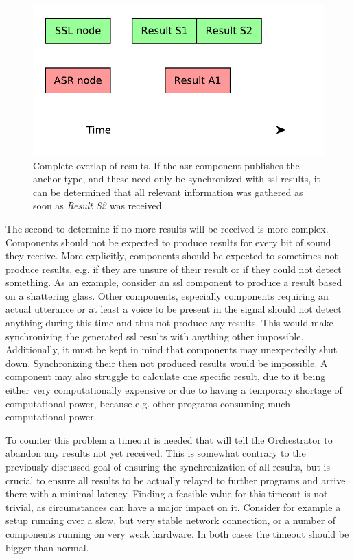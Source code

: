 \begin{figure}[]
	\centering
	\includegraphics[width=.66\textwidth]{diagrams/main_orc_all_results.pdf}
	\caption{Complete overlap of results.
		If the \gls{asr} component publishes the anchor type, and these need only be synchronized with \gls{ssl} results, it can be determined that all relevant information was gathered as soon as \textit{Result S2} was received.}
	\label{pic:main:orc:all_results}
\end{figure}

The second to determine if no more results will be received is more complex.
Components should not be expected to produce results for every bit of sound they receive.
More explicitly, components should be expected to sometimes not produce results, e.g. if they are unsure of their result or if they could not detect something.
As an example, consider an \gls{ssl} component to produce a result based on a shattering glass.
Other components, especially components requiring an actual utterance or at least a voice to be present in the signal should not detect anything during this time and thus not produce any results.
This would make synchronizing the generated \gls{ssl} results with anything other impossible. 
Additionally, it must be kept in mind that components may unexpectedly shut down.
Synchronizing their then not produced results would be impossible.
A component may also struggle to calculate one specific result, due to it being either very computationally expensive or due to having a temporary shortage of computational power, because e.g. other programs consuming much computational power.

To counter this problem a timeout is needed that will tell the Orchestrator to abandon any results not yet received.
This is somewhat contrary to the previously discussed goal of ensuring the synchronization of all results, but is crucial to ensure all results to be actually relayed to further programs and arrive there with a minimal latency.
Finding a feasible value for this timeout is not trivial, as circumstances can have a major impact on it.
Consider for example a setup running over a slow, but very stable network connection, or a number of components running on very weak hardware.
In both cases the timeout should be bigger than normal.

